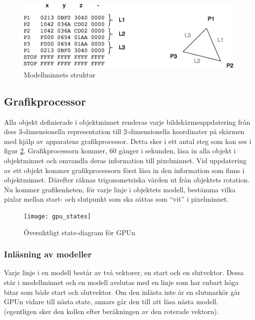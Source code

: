 \documentclass[a4paper]{article}
\begin{document}
    \begin{figure}[H]
        \centering
        \includegraphics[width=0.8\linewidth]{model_mem_structure}
        \caption{Modellminnets struktur}
        \label{fig:model_mem_structure}
    \end{figure}

    \subsection{Grafikprocessor}
    Alla objekt definierade i objektminnet renderas varje bildskärmsuppdatering från
    dess 3-dimensionella representation till 2-dimensionella koordinater på skärmen
    med hjälp av apparatens grafikprocessor. Detta sker i ett antal steg som kan ses
    i figur \ref{fig:gpu_states}. 
    Grafikprocessorn kommer, 60 gånger i sekunden, läsa in alla objekt i
    objektminnet och omvandla deras information till pixelminnet. Vid uppdatering av
    ett objekt kommer grafikprocessorn först läsa in den information som finns i
    objektminnet. Därefter räknas trigonometriska värden ut från objektets rotation.
    Nu kommer grafikenheten, för varje linje i objektets modell, bestämma vilka
    pixlar mellan start- och slutpunkt som ska sättas som “vit” i pixelminnet. 

    \begin{figure}[H]
        \centering
        \texttt{[image: gpu\_states]}
        \caption{Översiktligt state-diagram för GPUn}
        \label{fig:gpu_states}
    \end{figure}

    \subsubsection{Inläsning av modeller}
    Varje linje i en modell består av två vektorer, en start och en slutvektor. Dessa står i
    modellminnet och en modell avslutas med en linje som har enbart höga bitar som både start
    och slutvektor. Om den inlästa inte är en slutmarkör går GPUn vidare till nästa
    state, annars går den till att läsa nästa modell. (egentligen sker den kollen
    efter beräkningen av den roterade vektorn). 
\end{document}
